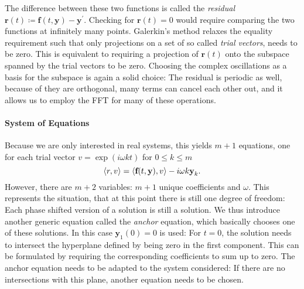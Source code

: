 The difference between these two functions is called the \emph{residual} $\textbf{r}(t) \coloneqq \textbf{f}(t,\textbf{y}) - \textbf{y}^\prime$.
Checking for $\textbf{r}(t) = 0$ would require comparing the two functions at infinitely many points.
Galerkin's method relaxes the equality requirement such that only projections on a set of so called \emph{trial vectors}, needs to be zero.
This is equivalent to requiring a projection of $\textbf{r}(t)$ onto the subspace spanned by the trial vectors to be zero.
Choosing the complex oscillations as a basis for the subspace is again a solid choice: The residual is periodic as well, because of they are orthogonal, many terms can cancel each other out, and it allows us to employ the FFT for many of these operations.

\paragraph{System of Equations} Because we are only interested in real systems, this yields $m+1$ equations, one for each trial vector $v = \exp\left( i \omega k t \right)$ for $0 \le k \le m$
\[
	\langle r , v \rangle = \langle \textbf{f}(t,\textbf{y}), v \rangle - i \omega k \textbf{y}_k \text.
\]
However, there are $m+2$ variables: $m+1$ unique coefficients and $\omega$.
This represents the situation, that at this point there is still one degree of freedom: Each phase shifted version of a solution is still a solution.
We thus introduce another generic equation called the \emph{anchor} equation, which basically chooses one of these solutions.
In this case $\textbf{y}_1(0) = 0$ is used:
For $t = 0$, the solution needs to intersect the hyperplane defined by being zero in the first component.
This can be formulated by requiring the corresponding coefficients to sum up to zero.
The anchor equation needs to be adapted to the system considered: If there are no intersections with this plane, another equation needs to be chosen.
